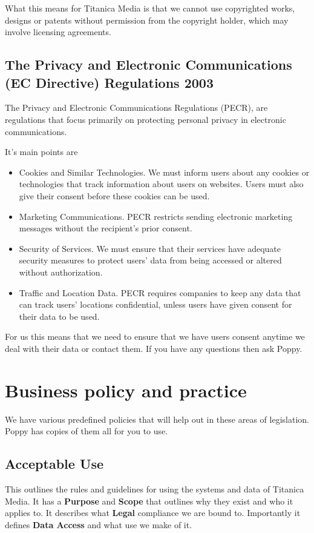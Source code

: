 \documentclass{article}
\begin{document}
What this means for Titanica Media is that we cannot use copyrighted works, designs or patents without permission from the copyright holder, which may involve licensing agreements.


\subsection{The Privacy and Electronic Communications (EC Directive) Regulations 2003}

The Privacy and Electronic Communications Regulations (PECR), are regulations that focus primarily on protecting personal privacy in electronic communications.

It's main points are
\begin{itemize}
    \item Cookies and Similar Technologies. We must inform users about any cookies or  technologies that track information about users on websites. Users must also give their consent before these cookies can be used.
    \item Marketing Communications. PECR restricts sending electronic marketing messages without the recipient's prior consent.
    \item Security of Services. We must ensure that their services have adequate security measures to protect users' data from being accessed or altered without authorization.
    \item Traffic and Location Data. PECR requires companies to keep any data that can track users' locations confidential, unless users have given consent for their data to be used.
\end{itemize}

For us this means that we need to ensure that we have users consent anytime we deal with their data or contact them. If you have any questions then ask Poppy.

\newpage
\section{Business policy and practice}
We have various predefined policies that will help out in these areas of legislation. Poppy has copies of them all for you to use.

\subsection{Acceptable Use}
This outlines the rules and guidelines for using the systems and data of Titanica Media.
It has a \textbf{Purpose} and \textbf{Scope} that outlines why they exist and who it applies to.
It describes what \textbf{Legal} compliance we are bound to. Importantly it defines \textbf{Data Access} and what use we make of it.
\end{document}
